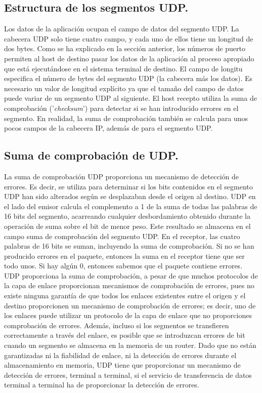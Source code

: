 \documentclass[a4paper,11pt]{article}
\begin{document}
\subsection{Estructura de los segmentos UDP.}
Los datos de la aplicación ocupan el campo de datos del segmento UDP. La cabecera UDP solo tiene cuatro campo, y cada uno de ellos tiene un longitud de dos bytes. Como se ha explicado en la sección anterior, los números de puerto permiten al host de destino pasar los datos de la aplicación al proceso apropiado que está ejecutándose en el sistema terminal de destino. El campo de longitu especifica el número de bytes del segmento UDP (la cabecera más los datos). Es necesario un valor de longitud explícito ya que el tamaño del campo de datos puede variar de un segmento UDP al siguiente. El host recepto utiliza la suma de comprobación  ('\textit{checksum}') para detectar si se han introducido errores en el segmento. En realidad, la suma de comprobación también se calcula para unos pocos campos de la cabecera IP, además de para el segmento UDP. \\

\subsection{Suma de comprobación de UDP.}
La suma de comprobación UDP proporciona un mecanismo de detección de errores. Es decir, se utiliza para determinar si los bits contenidos en el segmento UDP han sido alterados según se desplazaban desde el origen al destino. UDP en el lado del emisor calcula el complemento a 1 de la suma de todas las palabras de 16 bits del segmento, acarreando cualquier desbordamiento obtenido durante la operación de suma sobre el bit de menor peso. Este resultado se almacena en el campo suma de comprobación del segmento UDP. En el receptor, las cuatro palabras de 16 bits se suman, incluyendo la suma de comprobación. Si no se han producido errores en el paquete, entonces la suma en el receptor tiene que ser todo unos. Si hay algún 0, entonces sabemos que el paquete contiene errores. \\

UDP proporciona la suma de comprobación, a pesar de que muchos protocolos de la capa de enlace proporcionan mecanismos de comprobación de errores, pues no existe ninguna garantía de que todos los enlaces existentes entre el origen y el destino proporcionen un mecanismo de comprobación de errores; es decir, uno de los enlaces puede utilizar un protocolo de la capa de enlace que no proporciones comprobación de errores. Además, incluso si los segmentos se transfieren correctamente a través del enlace, es posible que se introduzcan errores de bit cuando un segmento se almacena en la memoria de un router. Dado que no están garantizadas ni la fiabilidad de enlace, ni la detección de errores durante el almacenamiento en memoria, UDP tiene que proporcionar un mecanismo de detección de errores, terminal a terminal, si el servicio de transferencia de datos terminal a terminal ha de proporcionar la detección de errores.
\end{document}
